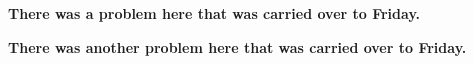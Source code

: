 \documentclass[handout]{mcs}
\begin{document}



\begin{problem}
\textbf{There was a problem here that was carried over to Friday.}


\end{problem}



\begin{problem}
\textbf{There was another problem here that was carried over to Friday.}


\end{problem}



\end{document}
